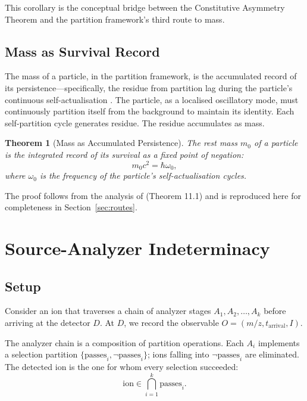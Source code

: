 \documentclass[twocolumn,10pt,a4paper]{article}
\newtheorem{theorem}{Theorem}[section]
\theoremstyle{definition}
\theoremstyle{remark}
\begin{document}
This corollary is the conceptual bridge between the Constitutive Asymmetry Theorem and the partition framework's third route to mass.

\subsection{Mass as Survival Record}

The mass of a particle, in the partition framework, is the accumulated record of its persistence---specifically, the residue from partition lag during the particle's continuous self-actualisation \citep{sachikonye2025partition}. The particle, as a localised oscillatory mode, must continuously partition itself from the background to maintain its identity. Each self-partition cycle generates residue. The residue accumulates as mass.

\begin{theorem}[Mass as Accumulated Persistence]
\label{thm:mass-persistence}
The rest mass $m_0$ of a particle is the integrated record of its survival as a fixed point of negation:
\begin{equation}
    m_0 c^2 = \hbar \omega_0,
\end{equation}
where $\omega_0$ is the frequency of the particle's self-actualisation cycles.
\end{theorem}

The proof follows from the analysis of \citep{sachikonye2025partition} (Theorem 11.1) and is reproduced here for completeness in Section~\ref{sec:routes}.

\section{Source-Analyzer Indeterminacy}
\label{sec:source}

\subsection{Setup}

Consider an ion that traverses a chain of analyzer stages $A_1, A_2, \ldots, A_k$ before arriving at the detector $D$. At $D$, we record the observable $O = (m/z, t_{\mathrm{arrival}}, I)$.

The analyzer chain is a composition of partition operations. Each $A_i$ implements a selection partition $\{\text{passes}_i, \neg\text{passes}_i\}$; ions falling into $\neg\text{passes}_i$ are eliminated. The detected ion is the one for whom every selection succeeded:
\begin{equation}
    \text{ion} \in \bigcap_{i=1}^{k} \text{passes}_i.
\end{equation}
\end{document}
